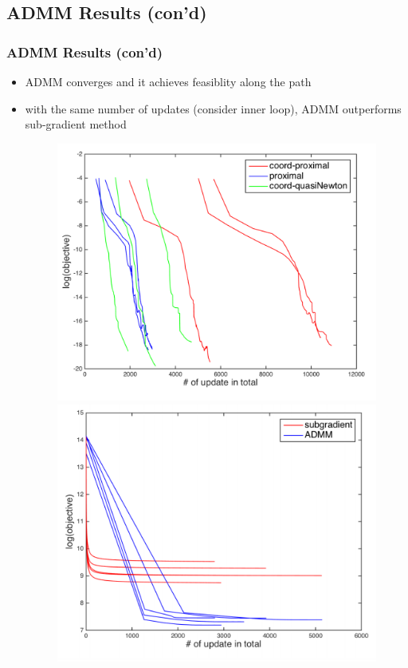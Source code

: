 \documentclass{beamer}
\begin{document}
\subsection{ADMM Results (con'd)}
\begin{frame}
\frametitle{ADMM Results (con'd)}
\begin{itemize}
  \item ADMM converges and it achieves feasiblity along the path
  \item with the same number of updates (consider inner loop), ADMM outperforms sub-gradient method
  \begin{figure}[htbp]
  \centering
  \begin{minipage}{0.45\textwidth}
    \centering
    \includegraphics[width=.8\textwidth]{images/feasibility}
  \end{minipage}
  \hfill
  \begin{minipage}{0.45\textwidth}
    \centering
    \includegraphics[width=.8\textwidth]{images/subgrad}
  \end{minipage}
  \end{figure}
\end{itemize}
\end{frame}
\end{document}
